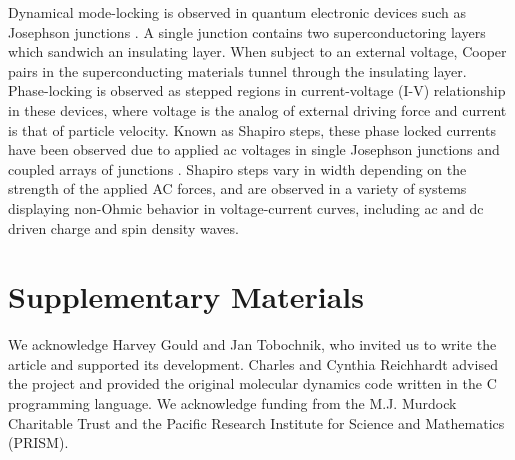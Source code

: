 \documentclass[twocolumn,preprintnumbers,amsmath,amssymb,aps,prx]{revtex4}
\begin{document}
Dynamical mode-locking
is %
observed
in quantum electronic
devices such as Josephson junctions \cite{Josephson1962,Josephson1965}.
A single junction contains 
two superconductoring layers which sandwich an insulating layer.
When subject to an external voltage,
Cooper pairs in the superconducting materials
tunnel through the insulating layer.
Phase-locking is observed as 
stepped regions in current-voltage (I-V) relationship in these devices,
where voltage is the analog of external driving force
and current is that of particle velocity.
Known as Shapiro steps, %
these phase locked currents  
have been observed due to applied ac voltages in 
single Josephson junctions \cite{Shapiro1963, Golubov2004} and
coupled arrays of junctions \cite{Benz1990}.
Shapiro steps vary in width depending on the strength of the
applied AC forces,
and are observed in a variety of systems
displaying
non-Ohmic behavior in voltage-current curves,
including
ac and dc driven
charge and spin density waves.


%
%


\section{Supplementary Materials}



\begin{acknowledgments}

  We acknowledge Harvey Gould and Jan Tobochnik,
  who invited us to write the article and
  supported its development.
  Charles and Cynthia Reichhardt advised 
  the project and provided the original molecular dynamics code
  written in the C programming language.
  We acknowledge funding from the M.J. Murdock Charitable Trust
  and the Pacific Research Institute for Science and Mathematics (PRISM).

\end{acknowledgments}
\end{document}
